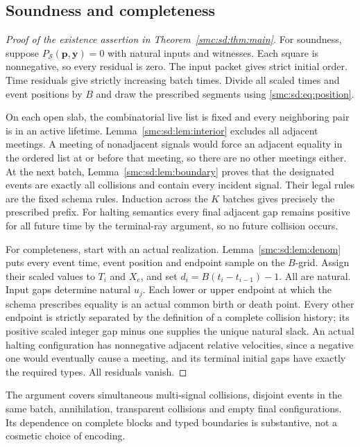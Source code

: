 \documentclass[11pt,letterpaper]{article}
\numberwithin{equation}{section}
\theoremstyle{definition}
\theoremstyle{remark}
\newcommand{\cS}{\mathcal S}
\begin{document}
\subsection{Soundness and completeness}
\begin{proof}[Proof of the existence assertion in Theorem~\ref{smc:sd:thm:main}]
For soundness, suppose $P_\cS(\mathbf p,\mathbf y)=0$ with natural inputs and witnesses. Each square is nonnegative, so every residual is zero. The input packet gives strict initial order. Time residuals give strictly increasing batch times. Divide all scaled times and event positions by $B$ and draw the prescribed segments using \eqref{smc:sd:eq:position}.

On each open slab, the combinatorial live list is fixed and every neighboring pair is in an active lifetime. Lemma~\ref{smc:sd:lem:interior} excludes all adjacent meetings. A meeting of nonadjacent signals would force an adjacent equality in the ordered list at or before that meeting, so there are no other meetings either. At the next batch, Lemma~\ref{smc:sd:lem:boundary} proves that the designated events are exactly all collisions and contain every incident signal. Their legal rules are the fixed schema rules. Induction across the $K$ batches gives precisely the prescribed prefix. For halting semantics every final adjacent gap remains positive for all future time by the terminal-ray argument, so no future collision occurs.

For completeness, start with an actual realization. Lemma~\ref{smc:sd:lem:denom} puts every event time, event position and endpoint sample on the $B$-grid. Assign their scaled values to $T_i$ and $X_e$, and set $d_i=B(t_i-t_{i-1})-1$. All are natural. Input gaps determine natural $u_j$. Each lower or upper endpoint at which the schema prescribes equality is an actual common birth or death point. Every other endpoint is strictly separated by the definition of a complete collision history; its positive scaled integer gap minus one supplies the unique natural slack. An actual halting configuration has nonnegative adjacent relative velocities, since a negative one would eventually cause a meeting, and its terminal initial gaps have exactly the required types. All residuals vanish.
\end{proof}

The argument covers simultaneous multi-signal collisions, disjoint events in the same batch, annihilation, transparent collisions and empty final configurations. Its dependence on complete blocks and typed boundaries is substantive, not a cosmetic choice of encoding.
\end{document}
